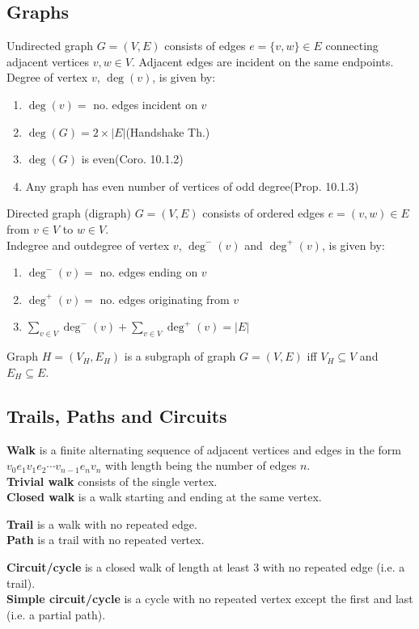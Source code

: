 \documentclass[12pt, a4paper]{article}
\begin{document}
\begin{multicols*}{3}
\section{Graphs}
Undirected graph $G = (V, E)$ consists of edges $e = \{v, w\} \in E$ connecting adjacent vertices $v, w \in V$. Adjacent edges are incident on the same endpoints.
Degree of vertex $v$, $\deg(v)$, is given by:
\begin{enumerate}[\roman*.]
  \item $\deg(v) =$ no. edges incident on $v$
  \item $\deg(G) = 2 \times |E|$\hfill(Handshake Th.)
  \item $\deg(G)$ is even\hfill(Coro. 10.1.2)
  \item Any graph has even number of vertices of odd degree\hfill(Prop. 10.1.3)
\end{enumerate}

Directed graph (digraph) $G = (V, E)$ consists of ordered edges $e = (v, w) \in E$ from $v \in V$ to $w\in V$.\\
Indegree and outdegree of vertex $v$, $\deg^-(v)$ and $\deg^+(v)$, is given by:
\begin{enumerate}[\roman*.]
  \item $\deg^-(v) =$ no. edges ending on $v$
  \item $\deg^+(v) =$ no. edges originating from $v$
  \item $\sum_{v\in V}\deg^-(v) + \sum_{v\in V}\deg^+(v) = |E|$
\end{enumerate}

Graph $H = (V_H, E_H)$ is a subgraph of graph $G = (V, E)$ iff $V_H \subseteq V$ and $E_H \subseteq E$.

\subsection{Trails, Paths and Circuits}
\textbf{Walk} is a finite alternating sequence of adjacent vertices and edges in the form $v_0e_1v_1e_2\cdots v_{n-1}e_nv_n$ with length being the number of edges $n$.\\
\textbf{Trivial walk} consists of the single vertex.\\
\textbf{Closed walk} is a walk starting and ending at the same vertex.

\textbf{Trail} is a walk with no repeated edge.\\
\textbf{Path} is a trail with no repeated vertex.

\textbf{Circuit/cycle} is a closed walk of length at least 3 with no repeated edge (i.e. a trail).\\
\textbf{Simple circuit/cycle} is a cycle with no repeated vertex except the first and last (i.e. a partial path).


\end{multicols*}
\end{document}
